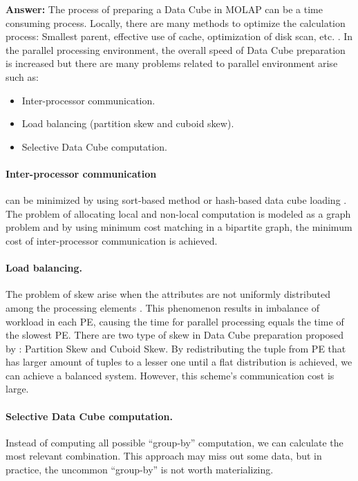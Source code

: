 \documentclass[a4paper,12pt]{article}
\begin{document}
\vspace{1.5em}
\noindent
\textbf{Answer:} 
\noindent
The process of preparing a Data Cube in MOLAP can be a time consuming process. Locally, there are many methods to optimize the calculation process: Smallest parent, effective use of cache, optimization of disk scan, etc. \cite{lec3} \cite{goil}. In the parallel processing environment, the overall speed of Data Cube preparation is increased but there are many problems related to parallel environment arise such as:
\begin{itemize}
    \setlength{\parskip}{0cm}
    \setlength{\itemsep}{0cm}
    \item Inter-processor communication. \cite{goil}
    \item Load balancing (partition skew and cuboid skew). \cite{muto}
    \item Selective Data Cube computation.
\end{itemize}

\paragraph{Inter-processor communication} can be minimized by using sort-based method or hash-based data cube loading \cite{goil}. The problem of allocating local and non-local computation is modeled as a graph problem and by using minimum cost matching in a bipartite graph, the minimum cost of inter-processor communication is achieved.

\paragraph{Load balancing.} The problem of skew arise when the attributes are not uniformly distributed among the processing elements \cite{muto}. This phenomenon results in imbalance of workload in each PE, causing the time for parallel processing equals the time of the slowest PE. There are two type of skew in Data Cube preparation proposed by \cite{muto}: Partition Skew and Cuboid Skew. By redistributing the tuple from PE that has larger amount of tuples to a lesser one until a flat distribution is achieved, we can achieve a balanced system. However, this scheme's communication cost is large.

\paragraph{Selective Data Cube computation.} Instead of computing all possible ``group-by'' computation, we can calculate the most relevant combination. This approach may miss out some data, but in practice, the uncommon ``group-by'' is not worth materializing.
\end{document}
